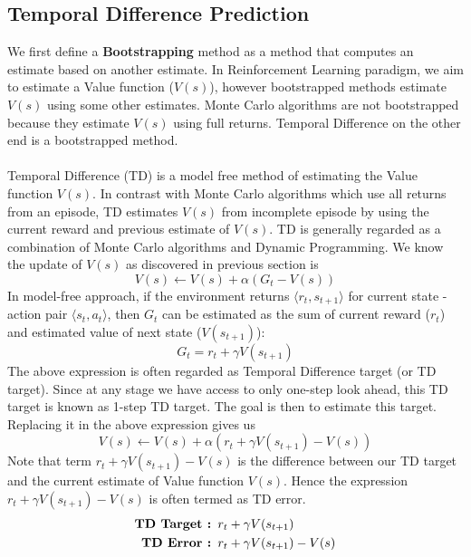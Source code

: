 \documentclass[11pt]{article}
\begin{document}
\subsection* {Temporal Difference Prediction}
We first define a \textbf{Bootstrapping} method as a method that computes an estimate based on another estimate. In Reinforcement Learning paradigm, we aim to estimate a Value function ($V(s)$), however bootstrapped methods estimate $V(s)$ using some other estimates. Monte Carlo algorithms are not bootstrapped because they estimate $V(s)$ using full returns. Temporal Difference on the other end is a bootstrapped method.\\\\
Temporal Difference (TD) is a model free method of estimating the Value function $V(s)$. In contrast with Monte Carlo algorithms which use all returns from an episode, TD estimates $V(s)$ from incomplete episode by using the current reward and previous estimate of $V(s)$. TD is generally regarded as a combination of Monte Carlo algorithms and Dynamic Programming. We know the update of $V(s)$ as discovered in previous section is
\begin{equation*}
    V(s) \leftarrow V(s) + \alpha (G_t - V(s))
\end{equation*}
In model-free approach, if the environment returns $\langle r_t,s_{t+1}\rangle$ for current state - action pair $\langle s_t,a_t \rangle$, then $G_t$ can be estimated as the sum of current reward ($r_t$) and estimated value of next state ($V(s_{t+1})$):
\begin{equation*}
    G_t = r_t + \gamma V(s_{t+1})
\end{equation*}
The above expression is often regarded as Temporal Difference target (or TD target). Since at any stage we have access to only one-step look ahead, this TD target is known as 1-step TD target. The goal is then to estimate this target. Replacing it in the above expression gives us
\begin{equation*}
    V(s) \leftarrow V(s) + \alpha (r_t + \gamma V(s_{t+1}) - V(s))
\end{equation*}
Note that term $r_t + \gamma V(s_{t+1}) - V(s)$ is the difference between our TD target and the current estimate of Value function $V(s)$. Hence the expression $r_t + \gamma V(s_{t+1}) - V(s)$ is often termed as TD error.
\begin{equation*}
\begin{split}
    \text{\textbf{TD Target : }}& r_t + \gamma V(s_{t+1}) \\
    \text{\textbf{TD Error : }}& r_t + \gamma V(s_{t+1}) - V(s)
\end{split}
\end{equation*}
\end{document}
